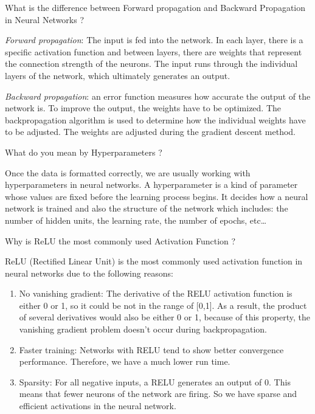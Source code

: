 \documentclass[12pt,a4paper]{exam}
\begin{document}

\question
What is the difference between Forward propagation and Backward Propagation in Neural Networks ?
\fillwithlines{3cm}
\begin{solution}
\emph{Forward propagation}: The input is fed into the network. In each layer, there is a specific activation function and between layers, there are weights that represent the connection strength of the neurons. The input runs through the individual layers of the network, which ultimately generates an output.

\emph{Backward propagation}: an error function measures how accurate the output of the network is. To improve the output, the weights have to be optimized. The backpropagation algorithm is used to determine how the individual weights have to be adjusted. The weights are adjusted during the gradient descent method.
\end{solution}


\question
What do you mean by Hyperparameters ?
\fillwithlines{3cm}
\begin{solution}
Once the data is formatted correctly, we are usually working with hyperparameters in neural networks. A hyperparameter is a kind of parameter whose values are fixed before the learning process begins.
It decides how a neural network is trained and also the structure of the network which includes: the number of hidden units, the learning rate, the number of epochs, etc\ldots
\end{solution}


\question
Why is ReLU the most commonly used Activation Function ?
\fillwithlines{3cm}
\begin{solution}
ReLU (Rectified Linear Unit) is the most commonly used activation function in neural networks due to the following reasons:
\begin{enumerate}
\item No vanishing gradient: The derivative of the RELU activation function is either 0 or 1, so it could be not in the range of [0,1]. As a result, the product of several derivatives would also be either 0 or 1, because of this property, the vanishing gradient problem doesn’t occur during backpropagation.
\item Faster training: Networks with RELU tend to show better convergence performance. Therefore, we have a much lower run time.
\item Sparsity: For all negative inputs, a RELU generates an output of 0. This means that fewer neurons of the network are firing. So we have sparse and efficient activations in the neural network.
\end{enumerate}
\end{solution}
\end{document}
